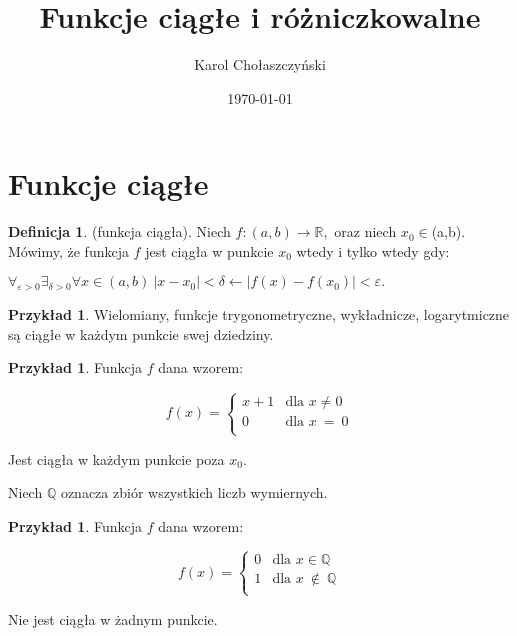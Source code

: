 \documentclass[12pt,a4paper]{article}
\title{Funkcje ciągłe i różniczkowalne}
\date{\today}
\author{Karol Chołaszczyński}
\theoremstyle{definition}
\newtheorem{df}[tw]{Definicja}
\newtheorem{ex}[tw]{Przykład}
\begin{document}
 
\maketitle

\tableofcontents

\section{Funkcje ciągłe} 

\begin{df}
(funkcja ciągła). Niech 
$f:(a,b) \to \mathbb{R},$
oraz niech
$x_{0}\in$(a,b). Mówimy, że funkcja $f$ jest ciągła w punkcie $x_{0}$ wtedy i tylko wtedy gdy:

\begin{center}
$\forall_{\varepsilon>0}\exists_{\delta>0} \forall x\in(a,b)\ |x-x_{0}|<\delta\leftarrow|f(x)-f(x_{0})|<\varepsilon.$ 
\end{center}
\end{df}

\begin{ex}
Wielomiany, funkcje trygonometryczne, wykładnicze, logarytmiczne są ciągłe w każdym punkcie swej dziedziny.
\end{ex}

\begin{ex}
Funkcja $f$ dana wzorem:
\begin{center}
\begin{displaymath}
f(x)= \left\{ \begin{array}{ll}
x+1 & \textrm{dla $x \neq 0$}\\
0 & \textrm{dla $x\ =\ 0$}\\
\end{array} \right.
\end{displaymath}
\end{center}
Jest ciągła w każdym punkcie poza $x_0$.
\end{ex}

Niech $\mathbb{Q}$ oznacza zbiór wszystkich liczb wymiernych.

\begin{ex}
Funkcja $f$ dana wzorem:
\begin{center}
\begin{displaymath}
f(x)= \left\{ \begin{array}{ll}
0 & \textrm{dla $x \in \mathbb{Q}$}\\
1 & \textrm{dla $x\ \notin\ \mathbb{Q}$}\\
\end{array} \right.
\end{displaymath}
\end{center}
Nie jest ciągła w żadnym punkcie.
\end{ex}
\end{document}
